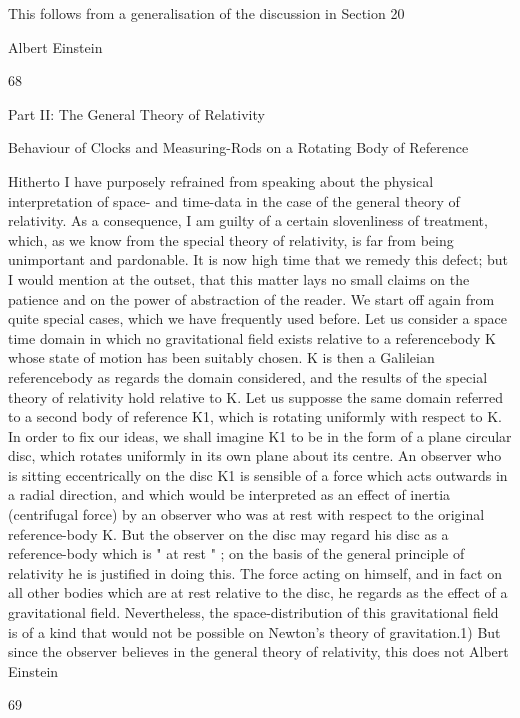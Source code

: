 \documentclass{article}
\begin{document}
This follows from a generalisation of the discussion in Section 20

Albert Einstein

68

Part II: The General Theory of Relativity

Behaviour of Clocks and
Measuring-Rods on a Rotating
Body of Reference

Hitherto I have purposely refrained from speaking about the physical interpretation of
space- and time-data in the case of the general theory of relativity. As a consequence, I am
guilty of a certain slovenliness of treatment, which, as we know from the special theory of
relativity, is far from being unimportant and pardonable. It is now high time that we remedy
this defect; but I would mention at the outset, that this matter lays no small claims on the
patience and on the power of abstraction of the reader.
We start off again from quite special cases, which we have frequently used before. Let us
consider a space time domain in which no gravitational field exists relative to a referencebody K whose state of motion has been suitably chosen. K is then a Galileian referencebody as regards the domain considered, and the results of the special theory of relativity
hold relative to K. Let us supposse the same domain referred to a second body of reference
K1, which is rotating uniformly with respect to K. In order to fix our ideas, we shall imagine
K1 to be in the form of a plane circular disc, which rotates uniformly in its own plane about
its centre. An observer who is sitting eccentrically on the disc K1 is sensible of a force
which acts outwards in a radial direction, and which would be interpreted as an effect of
inertia (centrifugal force) by an observer who was at rest with respect to the original
reference-body K. But the observer on the disc may regard his disc as a reference-body
which is " at rest " ; on the basis of the general principle of relativity he is justified in doing
this. The force acting on himself, and in fact on all other bodies which are at rest relative to
the disc, he regards as the effect of a gravitational field. Nevertheless, the space-distribution
of this gravitational field is of a kind that would not be possible on Newton's theory of
gravitation.1) But since the observer believes in the general theory of relativity, this does not
Albert Einstein

69
\end{document}
